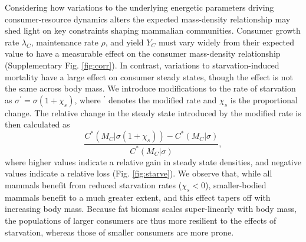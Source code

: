 \documentclass[11pt]{article}
\begin{document}
Considering how variations to the underlying energetic parameters driving consumer-resource dynamics alters the expected mass-density relationship may shed light on key constraints shaping mammalian communities. 
Consumer growth rate $\lambda_C$, maintenance rate $\rho$, and yield $Y_C$ must vary widely from their expected value to have a measurable effect on the consumer mass-density relationship (Supplementary Fig. \ref{fig:corr}).
In contrast, variations to starvation-induced mortality have a large effect on consumer steady states, though the effect is not the same across body mass.
We introduce modifications to the rate of starvation as $\sigma^\prime = \sigma(1+\chi_s)$, where ${}^\prime$ denotes the modified rate and $\chi_s$ is the proportional change.
The relative change in the steady state introduced by the modified rate is then calculated as 
\begin{equation}
\frac{C^*(M_C|\sigma(1+\chi_s)) - C^*(M_C|\sigma)}{C^*(M_C|\sigma)},
\end{equation}
where higher values indicate a relative gain in steady state densities, and negative values indicate a relative loss (Fig. \ref{fig:starve}).
We observe that, while all mammals benefit from reduced starvation rates ($\chi_s<0$), smaller-bodied mammals benefit to a much greater extent, and this effect tapers off with increasing body mass.
Because fat biomass scales super-linearly with body mass, the populations of larger consumers are thus more resilient to the effects of starvation, whereas those of smaller consumers are more prone.
\end{document}
